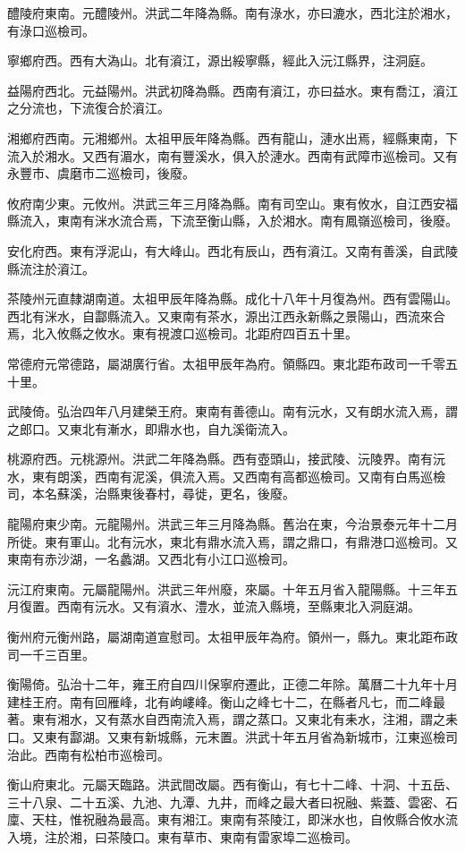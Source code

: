 醴陵府東南。元醴陵州。洪武二年降為縣。南有淥水，亦曰漉水，西北注於湘水，有淥口巡檢司。

寧鄉府西。西有大溈山。北有澬江，源出綏寧縣，經此入沅江縣界，注洞庭。

益陽府西北。元益陽州。洪武初降為縣。西南有澬江，亦曰益水。東有喬江，澬江之分流也，下流復合於澬江。

湘鄉府西南。元湘鄉州。太祖甲辰年降為縣。西有龍山，漣水出焉，經縣東南，下流入於湘水。又西有湄水，南有豐溪水，俱入於漣水。西南有武障市巡檢司。又有永豐市、虞磨市二巡檢司，後廢。

攸府南少東。元攸州。洪武三年三月降為縣。南有司空山。東有攸水，自江西安福縣流入，東南有洣水流合焉，下流至衡山縣，入於湘水。南有鳳嶺巡檢司，後廢。

安化府西。東有浮泥山，有大峰山。西北有辰山，西有澬江。又南有善溪，自武陵縣流注於澬江。

茶陵州元直隸湖南道。太祖甲辰年降為縣。成化十八年十月復為州。西有雲陽山。西北有洣水，自酃縣流入。又東南有茶水，源出江西永新縣之景陽山，西流來合焉，北入攸縣之攸水。東有視渡口巡檢司。北距府四百五十里。

常德府元常德路，屬湖廣行省。太祖甲辰年為府。領縣四。東北距布政司一千零五十里。

武陵倚。弘治四年八月建榮王府。東南有善德山。南有沅水，又有朗水流入焉，謂之郎口。又東北有漸水，即鼎水也，自九溪衛流入。

桃源府西。元桃源州。洪武二年降為縣。西有壺頭山，接武陵、沅陵界。南有沅水，東有朗溪，西南有泥溪，俱流入焉。又西南有高都巡檢司。又南有白馬巡檢司，本名蘇溪，治縣東後春村，尋徙，更名，後廢。

龍陽府東少南。元龍陽州。洪武三年三月降為縣。舊治在東，今治景泰元年十二月所徙。東有軍山。北有沅水，東北有鼎水流入焉，謂之鼎口，有鼎港口巡檢司。又東南有赤沙湖，一名蠡湖。又西北有小江口巡檢司。

沅江府東南。元屬龍陽州。洪武三年州廢，來屬。十年五月省入龍陽縣。十三年五月復置。西南有沅水。又有澬水、澧水，並流入縣境，至縣東北入洞庭湖。

衡州府元衡州路，屬湖南道宣慰司。太祖甲辰年為府。領州一，縣九。東北距布政司一千三百里。

衡陽倚。弘治十二年，雍王府自四川保寧府遷此，正德二年除。萬曆二十九年十月建桂王府。南有回雁峰，北有岣嶁峰。衡山之峰七十二，在縣者凡七，而二峰最著。東有湘水，又有蒸水自西南流入焉，謂之蒸口。又東北有耒水，注湘，謂之耒口。又東有酃湖。又東有新城縣，元末置。洪武十年五月省為新城市，江東巡檢司治此。西南有松柏市巡檢司。

衡山府東北。元屬天臨路。洪武間改屬。西有衡山，有七十二峰、十洞、十五岳、三十八泉、二十五溪、九池、九潭、九井，而峰之最大者曰祝融、紫蓋、雲密、石廩、天柱，惟祝融為最高。東有湘江。東南有茶陵江，即洣水也，自攸縣合攸水流入境，注於湘，曰茶陵口。東有草市、東南有雷家埠二巡檢司。

